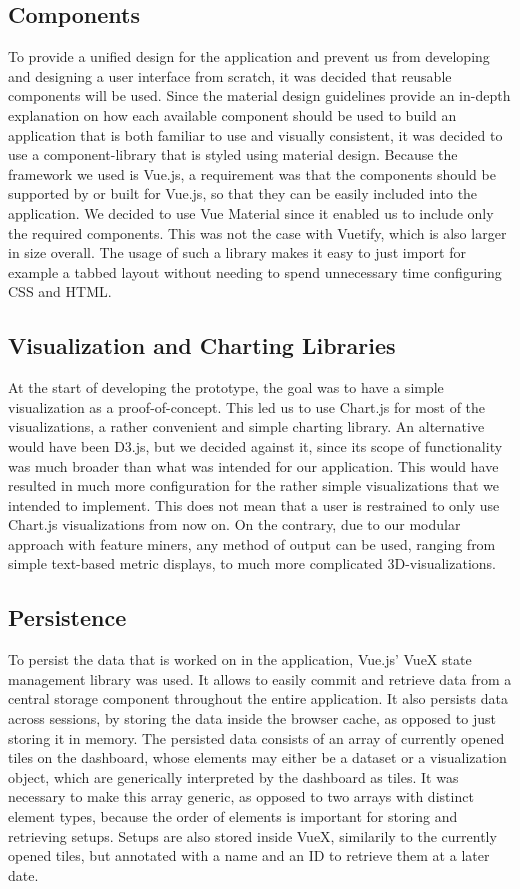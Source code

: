  \subsection{Components}
 To provide a unified design for the application and prevent us from developing and designing a user interface from scratch, it was decided that reusable components will be used. Since the material design guidelines provide an in-depth explanation on how each available component should be used to build an application that is both familiar to use and visually consistent, it was decided to use a component-library that is styled using material design. Because the framework we used is Vue.js, a requirement was that the components should be supported by or built for Vue.js, so that they can be easily included into the application. We decided to use Vue Material since it enabled us to include only the required components. This was not the case with Vuetify, which is also larger in size overall. The usage of such a library makes it easy to just import for example a tabbed layout without needing to spend unnecessary time configuring CSS and HTML.
 \subsection{Visualization and Charting Libraries}
 At the start of developing the prototype, the goal was to have a simple visualization as a proof-of-concept. This led us to use Chart.js for most of the visualizations, a rather convenient and simple charting library. An alternative would have been D3.js, but we decided against it, since its scope of functionality was much broader than what was intended for our application. This would have resulted in much more configuration for the rather simple visualizations that we intended to implement. This does not mean that a user is restrained to only use Chart.js visualizations from now on. On the contrary, due to our modular approach with feature miners, any method of output can be used, ranging from simple text-based metric displays, to much more complicated 3D-visualizations.
 \subsection{Persistence}
 To persist the data that is worked on in the application, Vue.js' VueX state management library was used. It allows to easily commit and retrieve data from a central storage component throughout the entire application. It also persists data across sessions, by storing the data inside the browser cache, as opposed to just storing it in memory. The persisted data consists of an array of currently opened tiles on the dashboard, whose elements may either be a dataset or a visualization object, which are generically interpreted by the dashboard as tiles. It was necessary to make this array generic, as opposed to two arrays with distinct element types, because the order of elements is important for storing and retrieving setups. Setups are also stored inside VueX, similarily to the currently opened tiles, but annotated with a name and an ID to retrieve them at a later date. 
